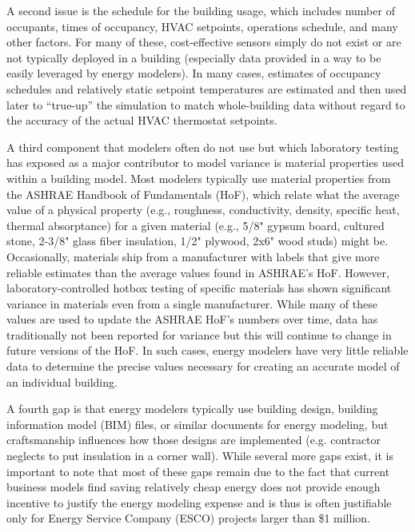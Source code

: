 \documentclass[preprint, review, 12pt]{elsarticle}
\begin{document}
A second issue is the schedule for the building usage, which includes number of occupants, times of occupancy, HVAC setpoints, operations schedule, and many other factors. For many of these, cost-effective sensors simply do not exist or are not typically deployed in a building (especially data provided in a way to be easily leveraged by energy modelers). In many cases, estimates of occupancy schedules and relatively static setpoint temperatures are estimated and then used later to ``true-up'' the simulation to match whole-building data without regard to the accuracy of the actual HVAC thermostat setpoints.

A third component that modelers often do not use but which laboratory testing has exposed as a major contributor to model variance is material properties used within a building model. Most modelers typically use material properties from the ASHRAE Handbook of Fundamentals (HoF), which relate what the average value of a physical property (e.g., roughness, conductivity, density, specific heat, thermal absorptance) for a given material (e.g., 5/8" gypsum board, cultured stone, 2-3/8" glass fiber insulation, 1/2" plywood, 2x6" wood studs) might be. Occasionally, materials ship from a manufacturer with labels that give more reliable estimates than the average values found in ASHRAE's HoF. However, laboratory-controlled hotbox testing of specific materials has shown significant variance in materials even from a single manufacturer. While many of these values are used to update the ASHRAE HoF's numbers over time, data has traditionally not been reported for variance but this will continue to change in future versions of the HoF. In such cases, energy modelers have very little reliable data to determine the precise values necessary for creating an accurate model of an individual building.

A fourth gap is that energy modelers typically use building design, building information model (BIM) files, or similar documents for energy modeling, but craftsmanship influences how those designs are implemented (e.g. contractor neglects to put insulation in a corner wall). While several more gaps exist, it is important to note that most of these gaps remain due to the fact that current business models find saving relatively cheap energy does not provide enough incentive to justify the energy modeling expense and is thus is often justifiable only for Energy Service Company (ESCO) projects larger than \$1 million.
\end{document}
